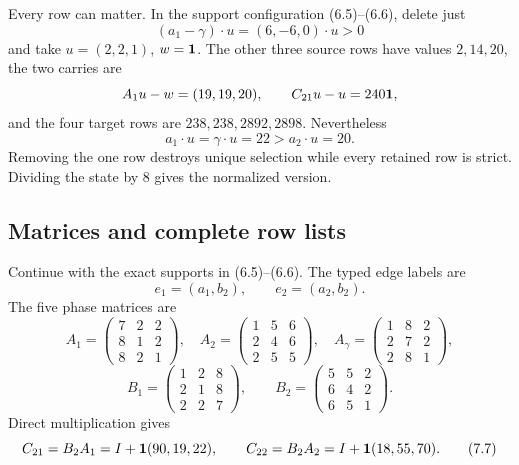 \documentclass[11pt]{article}
\theoremstyle{definition}
\theoremstyle{remark}
\begin{document}
Every row can matter.  In the support configuration (6.5)--(6.6), delete
just
\[
 (a_1-\gamma)\cdot u=(6,-6,0)\cdot u>0
\]
and take \(u=(2,2,1)\), \(w=\mathbf{1}\).  The other three source rows have
values \(2,14,20\), the two carries are
\[
 A_1u-w=(19,19,20),\qquad C_{21}u-u=240\mathbf{1},
\]
and the four target rows are \(238,238,2892,2898\).  Nevertheless
\[
 a_1\cdot u=\gamma\cdot u=22>a_2\cdot u=20.
\]
Removing the one row destroys unique selection while every retained row is
strict.  Dividing the state by \(8\) gives the normalized version.

\subsection{Matrices and complete row lists}

Continue with the exact supports in (6.5)--(6.6).  The typed edge labels are
\[
 e_1=(a_1,b_2),\qquad e_2=(a_2,b_2).
\]
The five phase matrices are
\[
 A_1=\begin{pmatrix}7&2&2\\8&1&2\\8&2&1\end{pmatrix},\quad
 A_2=\begin{pmatrix}1&5&6\\2&4&6\\2&5&5\end{pmatrix},\quad
 A_\gamma=\begin{pmatrix}1&8&2\\2&7&2\\2&8&1\end{pmatrix},
\tag{7.5}
\]
\[
 B_1=\begin{pmatrix}1&2&8\\2&1&8\\2&2&7\end{pmatrix},\qquad
 B_2=\begin{pmatrix}5&5&2\\6&4&2\\6&5&1\end{pmatrix}.
\tag{7.6}
\]
Direct multiplication gives
\[
 C_{21}=B_2A_1=I+\mathbf{1}(90,19,22),\qquad
 C_{22}=B_2A_2=I+\mathbf{1}(18,55,70).
\tag{7.7}
\]
\end{document}
